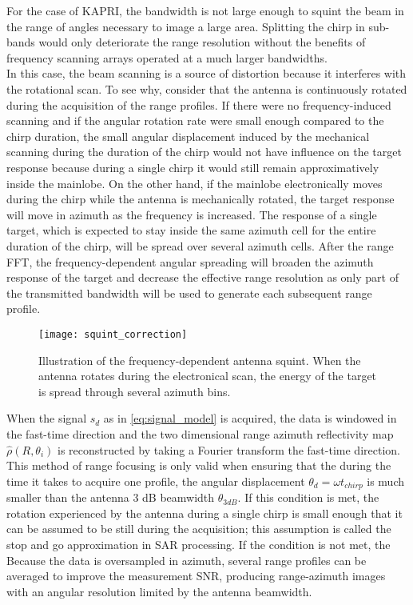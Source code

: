 For the case of KAPRI, the bandwidth is not large enough to squint the beam in the range of angles necessary to image a large area. Splitting the chirp in sub-bands would only deteriorate the range resolution without the benefits of frequency scanning arrays operated at a much larger bandwidths.\\ 
In this case, the beam scanning is a source of distortion because it interferes with the rotational scan. To see why, consider that the antenna is continuously rotated during the acquisition of the range profiles. If there were no frequency-induced scanning and if the angular rotation rate were small enough compared to the chirp duration, the small angular displacement induced by the mechanical scanning during the duration of the chirp would not have influence on the target response because during a single chirp it would still remain approximatively inside the mainlobe. On the other hand, if the mainlobe electronically moves during the chirp while the antenna is mechanically rotated, the target response will move in azimuth as the frequency is increased. The response of a single target, which is expected to stay inside the same azimuth cell for the entire duration of the chirp, will be spread over several azimuth cells. After the range FFT, the frequency-dependent angular spreading will broaden the azimuth response of the target and decrease the effective range resolution as only part of the transmitted bandwidth will be used to generate each subsequent range profile.\\
\begin{figure}[ht]
	\centering
	\texttt{[image: squint\_correction]}
	\caption{Illustration of the frequency-dependent antenna squint. When the antenna rotates during the electronical scan, the energy of the target is spread through several azimuth bins.}
	\label{fig:squint_correction}
\end{figure}
When the signal $s_{d}$ as in \autoref{eq:signal_model} is acquired, the data is windowed in the fast-time direction and the two dimensional range azimuth reflectivity map $\hat{\rho}\left(R, \theta_{i}\right)$ is reconstructed by taking a Fourier transform the fast-time direction.
This method of range focusing is only valid when ensuring that the during the time it takes to acquire one profile, the angular displacement $\theta_{d} = \omega t_{chirp}$ is much smaller than the antenna 3 dB beamwidth $\theta_{3dB}$. If this condition is met, the rotation experienced by the antenna during a single chirp is small enough that it can be assumed to be still during the acquisition; this assumption is called the stop and go approximation in SAR processing. If the condition is not met, the 
 Because the data is oversampled in azimuth, several range profiles can be averaged to improve the measurement SNR, producing range-azimuth images with an angular resolution limited by the antenna beamwidth.\\
